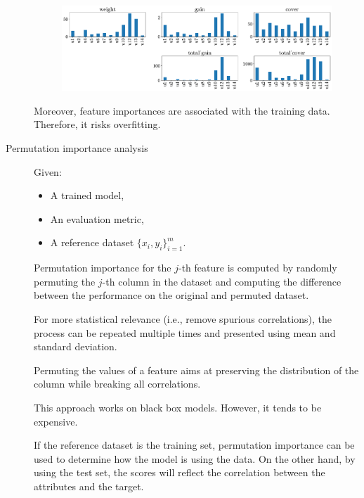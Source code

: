 \begin{description}
\begin{remark}
            \begin{figure}[H]
                \centering
                \includegraphics[width=0.95\linewidth]{./img/_biomed_feature_importances_all.pdf}
            \end{figure}

            Moreover, feature importances are associated with the training data. Therefore, it risks overfitting.
        \end{remark}

    \item[Permutation importance analysis] 
        Given:
        \begin{itemize}
            \item A trained model, 
            \item An evaluation metric,
            \item A reference dataset $\{ x_i, y_i \}_{i=1}^m$.
        \end{itemize}
        Permutation importance for the $j$-th feature is computed by randomly permuting the $j$-th column in the dataset and computing the difference between the performance on the original and permuted dataset.

        For more statistical relevance (i.e., remove spurious correlations), the process can be repeated multiple times and presented using mean and standard deviation.

        \begin{remark}
            Permuting the values of a feature aims at preserving the distribution of the column while breaking all correlations.
        \end{remark}

        \begin{remark}
            This approach works on black box models. However, it tends to be expensive.
        \end{remark}

        \begin{remark}
            If the reference dataset is the training set, permutation importance can be used to determine how the model is using the data. On the other hand, by using the test set, the scores will reflect the correlation between the attributes and the target.


\end{remark}
\end{description}

